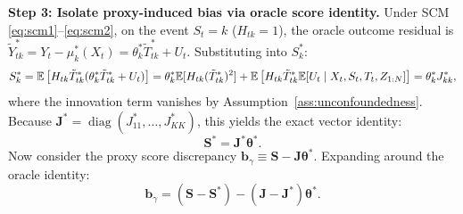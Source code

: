 \textbf{Step 3: Isolate proxy-induced bias via oracle score identity.}
Under SCM \eqref{eq:scm1}--\eqref{eq:scm2}, on the event $S_t = k$ ($H_{tk} = 1$), the oracle outcome residual is $\tilde{Y}_{tk}^* = Y_t - \mu_k^*(X_t) = \theta_k^* \tilde{T}_{tk}^* + U_t$.
Substituting into $S_k^*$:
\begin{equation}
    S_k^* = \mathbb{E}\left[ H_{tk} \tilde{T}_{tk}^* (\theta_k^* \tilde{T}_{tk}^* + U_t) \right] = \theta_k^* \mathbb{E}[H_{tk} (\tilde{T}_{tk}^*)^2] + \mathbb{E}\left[ H_{tk} \tilde{T}_{tk}^* \mathbb{E}[U_t \mid X_t, S_t, T_t, Z_{1:N}] \right] = \theta_k^* J_{kk}^*,
\end{equation}
where the innovation term vanishes by Assumption~\ref{ass:unconfoundedness}. Because $\boldsymbol{J}^* = \operatorname{diag}(J_{11}^*, \dots, J_{KK}^*)$, this yields the exact vector identity:
\begin{equation}
    \boldsymbol{S}^* = \boldsymbol{J}^* \boldsymbol{\theta}^*.
\end{equation}
Now consider the proxy score discrepancy $\boldsymbol{b}_\gamma \equiv \boldsymbol{S} - \boldsymbol{J}\boldsymbol{\theta}^*$. Expanding around the oracle identity:
\begin{equation}
    \boldsymbol{b}_\gamma = (\boldsymbol{S} - \boldsymbol{S}^*) - (\boldsymbol{J} - \boldsymbol{J}^*) \boldsymbol{\theta}^*.
\end{equation}

